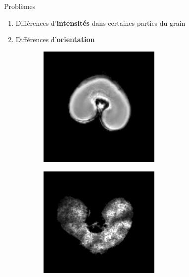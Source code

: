\documentclass[10pt]{beamer}
\begin{document}
\begin{frame}{Problèmes}
  \begin{enumerate}
  \item Différences d'\textbf{intensités} dans certaines parties du grain
  \item Différences d'\textbf{orientation}
  \end{enumerate}

  \begin{figure}[ht]
    \centering
    \begin{subfigure}[t]{0.5\textwidth}
      \centering
      \includegraphics[width=0.65\textwidth]{fig/mri_slice6.png}
    \end{subfigure}%
    \begin{subfigure}[t]{0.5\textwidth}
      \centering
      \includegraphics[width=0.65\textwidth]{fig/maldi_slice6}
    \end{subfigure}%

  \end{figure}

\end{frame}
\end{document}
